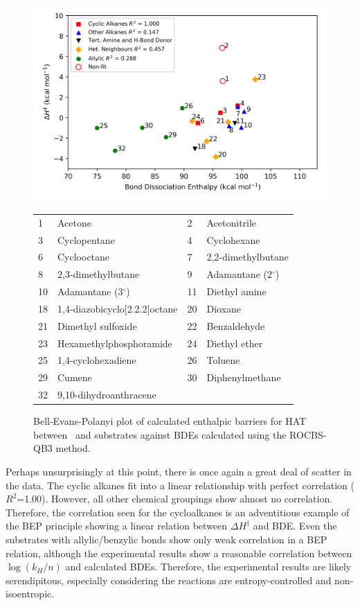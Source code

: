 \begin{figure}[!htbp]
  \centering
  \includegraphics[width=\textwidth]{figures/bep-dG}
\begin{tabularx}{\textwidth}{| l X l X |}
  \hline
  1 & Acetone & 2 & Acetonitrile \\
  3 & Cyclopentane & 4 & Cyclohexane \\
  6 & Cyclooctane & 7 & 2,2-dimethylbutane \\
  8 & 2,3-dimethylbutane & 9 & Adamantane (2$^\circ$) \\
  10 & Adamantane (3$^\circ$) & 11 & Diethyl amine \\
  18 & 1,4-diazobicyclo[2.2.2]octane & 20 & Dioxane \\
  21 & Dimethyl sulfoxide & 22 & Benzaldehyde \\
  23 & Hexamethylphosphoramide & 24 & Diethyl ether \\
  25 & 1,4-cyclohexadiene & 26 & Toluene \\
  29 & Cumene & 30 & Diphenylmethane \\
  32 & 9,10-dihydroanthracene & & \\
  \hline
\end{tabularx}
\caption{Bell-Evans-Polanyi plot of calculated enthalpic barriers for HAT between \cumo\ and substrates against BDEs calculated using the ROCBS-QB3 method.}
\label{fig:bep-dG}
\end{figure}

Perhaps unsurprisingly at this point, there is once again a great deal of scatter in the data. The cyclic alkanes fit into a linear relationship with perfect correlation ($R^2$=1.00). However, all other chemical groupings show almost no correlation. Therefore, the correlation seen for the cycloalkanes is an adventitious example of the BEP principle showing a linear relation between $\Delta H^\ddagger$ and BDE. Even the substrates with allylic/benzylic  bonds show only weak correlation in a BEP relation, although the experimental results show a reasonable correlation between $\log(k_H/n)$ and calculated BDEs. Therefore, the experimental results are likely serendipitous, especially considering the reactions are entropy-controlled and non-isoentropic.

